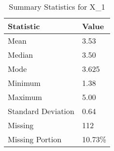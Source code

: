 
\begin{table}[H]
\centering
\begin{tabular}{|l|l|}
\hline
\textbf{Statistic} & \textbf{Value} \\ \hline
Mean               & 3.53 \\ \hline
Median             & 3.50 \\ \hline
Mode               & 3.625 \\ \hline
Minimum            & 1.38 \\ \hline
Maximum            & 5.00 \\ \hline
Standard Deviation & 0.64 \\ \hline
Missing            & 112 \\ \hline
Missing Portion    & 10.73\% \\ \hline
\end{tabular}
\caption{Summary Statistics for X_1}
\end{table}

